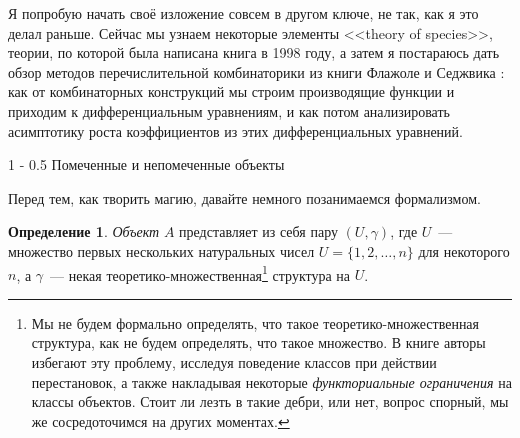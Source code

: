\documentclass[a5paper]{article}
\makeatletter
\theoremstyle{definition}
\newtheorem*{definition}{Определение}
\renewcommand{\section}{\@startsection
{section}%
{1}%
{\z@}%
{-\baselineskip}%
{0.5\baselineskip}%
{\centering\large\scshape}} %
\makeatother
\begin{document}
Я попробую начать своё изложение совсем в другом ключе, не так, как я это делал 
раньше. Сейчас мы узнаем некоторые элементы <<theory of species>>, теории, по 
которой была написана книга \cite{species} в 1998 году, а затем я постараюсь 
дать обзор методов перечислительной комбинаторики из книги Флажоле и Седжвика 
\cite{ac}: как от комбинаторных конструкций мы строим производящие функции и 
приходим к дифференциальным уравнениям, и как потом анализировать асимптотику 
роста коэффициентов из этих дифференциальных уравнений.

\section{Помеченные и непомеченные объекты}

Перед тем, как творить магию, давайте немного позанимаемся формализмом.

\begin{definition}
	\textit{Объект} \( A \) представляет из себя пару \( (U, \gamma) \), где \( 
	U \)~--- множество первых нескольких натуральных чисел \( U = \{1, 2, 
	\ldots, n\} \) для некоторого \( n \), а \( \gamma \)~--- некая 
	теоретико-множественная\footnote{Мы не будем формально определять, что 
	такое теоретико-множественная структура, как не будем определять, что такое 
	множество. В книге \cite{species} авторы избегают эту проблему, исследуя 
	поведение классов при действии перестановок, а также накладывая некоторые 
	\textit{функториальные ограничения} на классы объектов. Стоит ли лезть в 
	такие дебри, или нет, вопрос спорный, мы же сосредоточимся на других 
	моментах.} структура на \( U \).
\end{definition}
\end{document}
